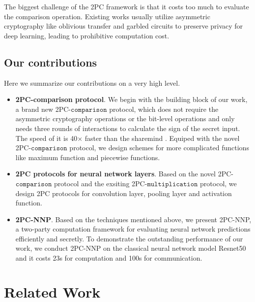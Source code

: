 \documentclass[letterpaper]{article} %
\begin{document}
    The biggest challenge of the 2PC framework is that it costs too much to
    evaluate the comparison operation.
    Existing works usually utilize asymmetric cryptography like oblivious transfer and garbled circuits
		to preserve privacy for deep learning,
    leading to prohibitive computation cost.


    \subsection{Our contributions}%
    Here we summarize our contributions on a very high level.


    \begin{itemize}
        \item \textbf{2PC-comparison protocol}.
        We begin with the building block of our work, a brand new 2PC-$\mathtt{comparison}$ protocol,
        which does not require the asymmetric cryptography operations or the bit-level operations
        and only needs three rounds of interactions to calculate the sign of the secret input.
        The speed of it is 40$\times$ faster than the sharemind \cite{Sharemind}.
        Equiped with the novel 2PC-$\mathtt{comparison}$ protocol, we design schemes for more complicated functions
        like maximum function and piecewise functions.

        \item \textbf{2PC protocols for neural network layers}.
        Based on the novel 2PC-$\mathtt{comparison}$ protocol and the exsiting 2PC-$\mathtt{multiplication}$ protocol,
        we design 2PC protocols for convolution layer, pooling layer and activation function.

        \item \textbf{2PC-NNP}.
        Based on the techniques mentioned above,
        we present 2PC-NNP, a two-party computation framework
        for evaluating neural network predictions efficiently and secretly.
        To demonstrate the outstanding performance of our work,
        we conduct 2PC-NNP on the classical neural network model Resnet50 and
        it costs 23s for computation and 100s for communication.

    \end{itemize}






\section{Related Work}
\end{document}
